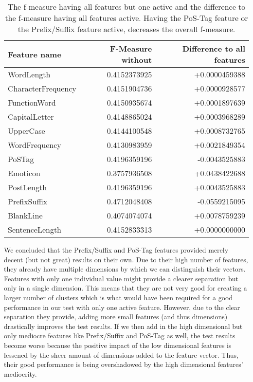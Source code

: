 \begin{table}[h]
	\begin{center}
    \begin{tabular}{l|r|r}
	Feature name & F-Measure without & Difference to all features \\ \hline
	WordLength & 0.4152373925 & +0.0000459388 \\ \hline
	CharacterFrequency & 0.4151904736 & +0.0000928577 \\ \hline
	FunctionWord  & 0.4150935674 & +0.0001897639 \\ \hline
	CapitalLetter & 0.4148865024 & +0.0003968289 \\ \hline
	UpperCase & 0.4144100548 & +0.0008732765 \\ \hline
	WordFrequency &	0.4130983959 & +0.0021849354 \\ \hline
	PoSTag & 0.4196359196 & -0.0043525883 \\ \hline
	Emoticon &	0.3757936508 & +0.0438422688 \\ \hline
	PostLength & 0.4196359196 & +0.0043525883 \\ \hline
	PrefixSuffix & 0.4712048408 & -0.0559215095 \\ \hline
	BlankLine & 0.4074074074 & +0.0078759239 \\ \hline
	SentenceLength & 0.4152833313 & +0.0000000000 \\
    \end{tabular}
    \end{center}
	\caption{The f-measure having all features but one active and the difference to the f-measure having all features active. Having the PoS-Tag feature or the Prefix/Suffix feature active, decreases the overall f-measure.}
	\label{tab:feature_evaluation_1}
\end{table}

We concluded that the Prefix/Suffix and PoS-Tag features provided merely decent (but not great) results on their own.
Due to their high number of features, they already have multiple dimensions by which we can distinguish their vectors.
Features with only one individual value might provide a clearer separation but only in a single dimension.
This means that they are not very good for creating a larger number of clusters which is what would have been required for a good performance in our test with only one active feature.
However, due to the clear separation they provide, adding more small features (and thus dimensions) drastically improves the test results.
If we then add in the high dimensional but only mediocre features like Prefix/Suffix and PoS-Tag as well, the test results become worse because the positive impact of the low dimensional features is lessened by the sheer amount of dimensions added to the feature vector.
Thus, their good performance is being overshadowed by the high dimensional features' mediocrity.


